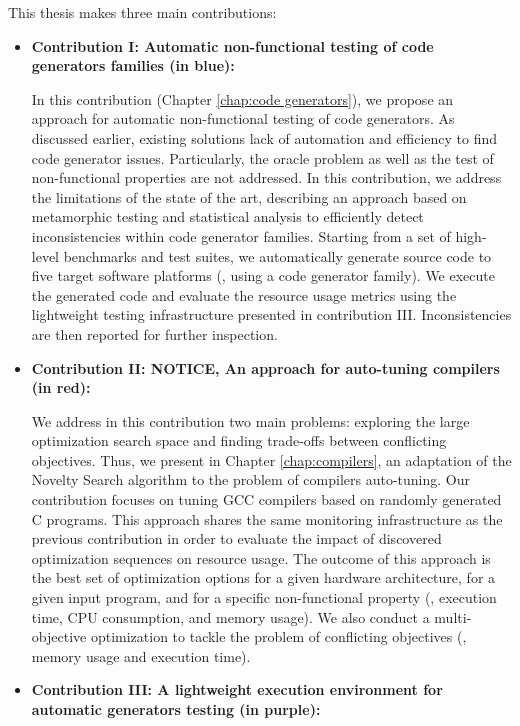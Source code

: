 This thesis makes three main contributions:
\begin{itemize}
	\item \textbf{Contribution I: Automatic non-functional testing of code generators families (in blue): }
	
	In this contribution (Chapter \ref{chap:code generators}), we propose an approach for automatic non-functional  testing of code generators. As discussed earlier, existing solutions lack of automation and efficiency to find code generator issues. Particularly, the oracle problem as well as the test of non-functional properties are not addressed. In this contribution, we address the limitations of the state of the art, describing an approach based on metamorphic testing and statistical analysis to efficiently detect inconsistencies within code generator families.
	Starting from a set of high-level benchmarks and test suites, we automatically generate source code to five target software platforms (\ie, using a code generator family). We execute the generated code and evaluate the resource usage metrics using the lightweight testing infrastructure presented in contribution III. Inconsistencies are then reported for further inspection.  
	
	\item \textbf{Contribution II: NOTICE, An approach for auto-tuning compilers (in red):}
	
	We address in this contribution two main problems: exploring the large optimization search space and finding trade-offs between conflicting objectives. 
	Thus, we present in Chapter \ref{chap:compilers}, an adaptation of the Novelty Search algorithm to the problem of compilers auto-tuning. Our contribution focuses on tuning GCC compilers based on randomly generated C programs.
	This approach shares the same monitoring infrastructure as the previous contribution in order to evaluate the impact of discovered optimization sequences on resource usage. The outcome of this approach is the best set of optimization options for a given hardware architecture, for a given input program, and for a specific non-functional property (\ie, execution time, CPU consumption, and memory usage). We also conduct a multi-objective optimization to tackle the problem of conflicting objectives (\eg, memory usage and execution time).
	
	\item \textbf{Contribution III: A lightweight execution environment for automatic generators testing (in purple):}
	

\end{itemize}
